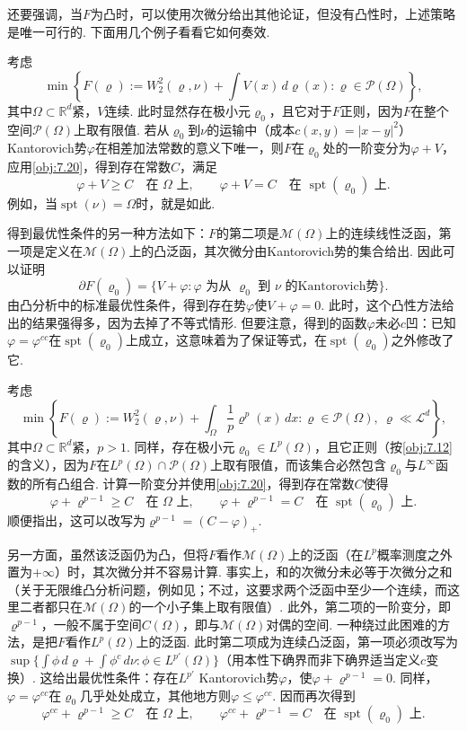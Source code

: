 还要强调，当$F$为凸时，可以使用次微分给出其他论证，但没有凸性时，上述策略是唯一可行的. 下面用几个例子看看它如何奏效.
\begin{example}\label{obj:7.21}
考虑
\[
 \min\left\{F(\varrho):=W_2^2(\varrho,\nu)+\int V(x)\,d\varrho(x):
                    \varrho\in\mathscr P(\Omega)\right\},
\]
其中$\Omega\subset\mathbb R^d$紧，$V$连续. 此时显然存在极小元$\varrho_0$，且它对于$F$正则，因为$F$在整个空间$\mathscr P(\Omega)$上取有限值. 若从$\varrho_0$到$\nu$的运输中（成本$c(x,y)=|x-y|^2$）Kantorovich势$\varphi$在相差加法常数的意义下唯一，则$F$在$\varrho_0$处的一阶变分为$\varphi+V$，应用\autoref{obj:7.20}，得到存在常数$C$，满足
\[
 \varphi+V\geq C\quad\text{在 }\Omega\text{ 上},\qquad
 \varphi+V=C\quad\text{在 }\operatorname{spt}(\varrho_0)\text{ 上}.
\]
例如，当$\operatorname{spt}(\nu)=\Omega$时，就是如此.

得到最优性条件的另一种方法如下：$F$的第二项是$\mathscr M(\Omega)$上的连续线性泛函，第一项是定义在$\mathscr M(\Omega)$上的凸泛函，其次微分由Kantorovich势的集合给出. 因此可以证明
\[
 \partial F(\varrho_0)=\{V+\varphi:\varphi\text{ 为从 }\varrho_0\text{ 到 }\nu
                                     \text{ 的Kantorovich势}\}.
\]
由凸分析中的标准最优性条件，得到存在势$\varphi$使$V+\varphi=0$. 此时，这个凸性方法给出的结果强得多，因为去掉了不等式情形. 但要注意，得到的函数$\varphi$未必$c$凹：已知$\varphi=\varphi^{cc}$在$\operatorname{spt}(\varrho_0)$上成立，这意味着为了保证等式，在$\operatorname{spt}(\varrho_0)$之外修改了它.
\end{example}
\begin{example}\label{obj:7.22}
考虑
\[
 \min\left\{F(\varrho):=W_2^2(\varrho,\nu)
                  +\int_\Omega\frac1p\varrho^p(x)\,dx:
             \varrho\in\mathscr P(\Omega),\ \varrho\ll\mathscr L^d\right\},
\]
其中$\Omega\subset\mathbb R^d$紧，$p>1$. 同样，存在极小元$\varrho_0\in L^p(\Omega)$，且它正则（按\autoref{obj:7.12}的含义），因为$F$在$L^p(\Omega)\cap\mathscr P(\Omega)$上取有限值，而该集合必然包含$\varrho_0$与$L^\infty$函数的所有凸组合. 计算一阶变分并使用\autoref{obj:7.20}，得到存在常数$C$使得
\[
 \varphi+\varrho^{p-1}\geq C\quad\text{在 }\Omega\text{ 上},\qquad
 \varphi+\varrho^{p-1}=C\quad\text{在 }\operatorname{spt}(\varrho_0)\text{ 上}.
\]
顺便指出，这可以改写为$\varrho^{p-1}=(C-\varphi)_+$.

另一方面，虽然该泛函仍为凸，但将$F$看作$\mathscr M(\Omega)$上的泛函（在$L^p$概率测度之外置为$+\infty$）时，其次微分并不容易计算. 事实上，和的次微分未必等于次微分之和（关于无限维凸分析问题，例如见\cite{b157}；不过，这要求两个泛函中至少一个连续，而这里二者都只在$\mathscr M(\Omega)$的一个小子集上取有限值）. 此外，第二项的一阶变分，即$\varrho^{p-1}$，一般不属于空间$C(\Omega)$，即与$\mathscr M(\Omega)$对偶的空间. 一种绕过此困难的方法，是把$F$看作$L^p(\Omega)$上的泛函. 此时第二项成为连续凸泛函，第一项必须改写为$\sup\{\int\phi\,d\varrho+\int\phi^c\,d\nu:\phi\in L^{p'}(\Omega)\}$（用本性下确界而非下确界适当定义$c$变换）. 这给出最优性条件：存在$L^{p'}$ Kantorovich势$\varphi$，使$\varphi+\varrho^{p-1}=0$. 同样，$\varphi=\varphi^{cc}$在$\varrho_0$几乎处处成立，其他地方则$\varphi\leq\varphi^{cc}$. 因而再次得到
\[
 \varphi^{cc}+\varrho^{p-1}\geq C\quad\text{在 }\Omega\text{ 上},\qquad
 \varphi^{cc}+\varrho^{p-1}=C\quad\text{在 }\operatorname{spt}(\varrho_0)\text{ 上}.
\]
\end{example}
